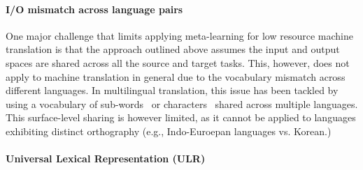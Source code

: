 \paragraph{I/O mismatch across language pairs}
One major challenge that limits applying meta-learning for low resource machine translation is that
the approach outlined above assumes the input and output spaces are shared across all the source and target tasks. This, however, does not apply to machine translation in general due to the vocabulary mismatch across different languages. In multilingual translation, this issue has been tackled by using a vocabulary of sub-words~\citep{sennrich2015improving} or characters~\citep{lee2016fully} shared across multiple languages. This surface-level sharing is however limited, as it cannot be applied to languages exhibiting distinct orthography (e.g., Indo-Euroepan languages vs. Korean.) 



\paragraph{Universal Lexical Representation (ULR)} 


